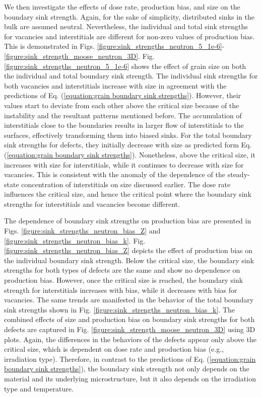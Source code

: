 \documentclass[utf8]{frontiersSCNS} %
\begin{document}
    We then investigate the effects of dose rate, production bias, and size on the boundary sink strength. Again, for the sake of simplicity, distributed sinks in the bulk are assumed neutral. Nevertheless, the individual and total sink strengths for vacancies and interstitials are different for non-zero values of production bias. This is demonstrated in Figs. \ref{figure:sink_strengths_neutron_5_1e-6}-\ref{figure:sink_strength_moose_neutron_3D}. Fig. \ref{figure:sink_strengths_neutron_5_1e-6} shows the effect of grain size on both the individual and total boundary sink strength. The individual sink strengths for both vacancies and interstitials increase with size in agreement with the predictions of Eq. (\ref{equation:grain boundary sink strengths}). However, their values start to deviate from each other above the critical size because of the instability and the resultant patterns mentioned before. The accumulation of interstitials close to the boundaries results in larger flow of interstitials to the surfaces, effectively transforming them into biased sinks. For the total boundary sink strengths for defects, they initially decrease with size as predicted form Eq. (\ref{equation:grain boundary sink strengths}). Nonetheless, above the critical size, it increases with size for interstitials, while it continues to decrease with size for vacancies. This is consistent with the anomaly of the dependence of the steady-state concentration of interstitials on size discussed earlier. The dose rate influences the critical size, and hence the critical point where the boundary sink strengths for interstitials and vacancies become different. 
    
    The dependence of boundary sink strengths on production bias are presented in Figs. \ref{figure:sink_strengths_neutron_bias_Z} and \ref{figure:sink_strengths_neutron_bias_k}. Fig. \ref{figure:sink_strengths_neutron_bias_Z} depicts the effect of production bias on the individual boundary sink strength. Below the critical size, the boundary sink strengths for both types of defects are the same and show no dependence on production bias. However, once the critical size is reached, the boundary sink strength for interstitials increases with bias, while it decreases with bias for vacancies. The same trends are manifested in the behavior of the total boundary sink strengths shown in Fig. \ref{figure:sink_strengths_neutron_bias_k}. The combined effects of size and production bias on boundary sink strengths for both defects are captured in Fig. \ref{figure:sink_strength_moose_neutron_3D} using 3D plots. Again, the differences in the behaviors of the defects appear only above the critical size, which is dependent on dose rate and production bias (e.g., irradiation type). Therefore, in contrast to the predictions of Eq. (\ref{equation:grain boundary sink strengths}), the boundary sink strength not only depends on the material and its underlying microstructure, but it also depends on the irradiation type and temperature.
    
\end{document}
